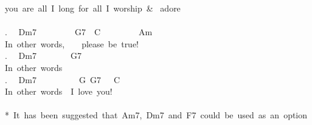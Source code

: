 {you\ are\ all\ I\ long\ for\ all\ I\ worship\ \& \ adore\\
\\
. \ \ Dm7\ \ \ \ \ \ \ \ \ G7\ \ C\ \ \ \ \ \ \ \ \ Am\\
In\ other\ words,\ \ \ \ please\ be\ true!\\
. \ \ Dm7\ \ \ \ \ \ \ \ G7\\
In\ other\ words\\
. \ \ Dm7\ \ \ \ \ \ \ \ \ \ G\ G7\ \ \ C\\
In\ other\ words\ \ I\ love\ you!\\
\\
*\ It\ has\ been\ suggested\ that\ Am7,\ Dm7\ and\ F7\ could\ be\ used\ as\ an\ option\\
}
